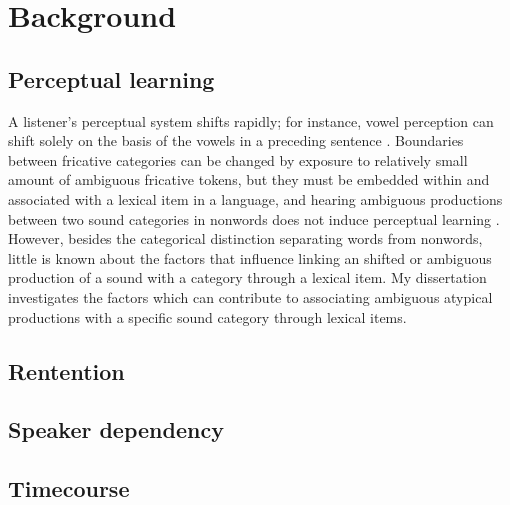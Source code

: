 
\chapter{Background}

\section{Perceptual learning}

A listener's perceptual system shifts rapidly; for instance, vowel perception can shift solely on the basis of the vowels in a  preceding sentence \citep{Ladefoged1957}.  Boundaries between fricative categories can be changed by exposure to relatively small amount of ambiguous fricative tokens, but they must be embedded within and associated with a lexical item in a language, and hearing ambiguous productions between two sound categories in nonwords does not induce perceptual learning \citep{Norris2003}. However, besides the categorical distinction separating words from nonwords, little is known about the factors that influence linking an shifted or ambiguous production of a sound with a category through a lexical item. My dissertation investigates the factors which can contribute to associating ambiguous atypical productions with a specific sound category through lexical items. 


\citet{Norris2003}



\section{Rentention}

\citet{Kraljic2005}

\citet{Eisner2006}

\section{Speaker dependency}

\citet{Kraljic2007}

\citet{Reinisch2013}

\section{Timecourse}

\citet{Vroomen2004} \cite{Kleinschmidt2011}

